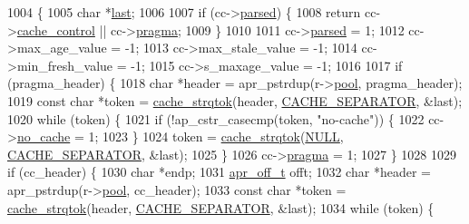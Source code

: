 \begin{DoxyCode}
1004 \{
1005     \textcolor{keywordtype}{char} *\hyperlink{group__apr__strings_ga882d08c2e3ad3004cdfc219601ebaac8}{last};
1006 
1007     \textcolor{keywordflow}{if} (cc->\hyperlink{structcache__control_a386401082305485525836ed568c6b46a}{parsed}) \{
1008         \textcolor{keywordflow}{return} cc->\hyperlink{structcache__control_ab54624480acafa695556a98b70938413}{cache\_control} || cc->\hyperlink{structcache__control_a60d185604c017054a36964edaadd0220}{pragma};
1009     \}
1010 
1011     cc->\hyperlink{structcache__control_a386401082305485525836ed568c6b46a}{parsed} = 1;
1012     cc->max\_age\_value = -1;
1013     cc->max\_stale\_value = -1;
1014     cc->min\_fresh\_value = -1;
1015     cc->s\_maxage\_value = -1;
1016 
1017     \textcolor{keywordflow}{if} (pragma\_header) \{
1018         \textcolor{keywordtype}{char} *header = apr\_pstrdup(r->\hyperlink{structrequest__rec_aa0a0c16f9a9ab3901cdb3f3c9c9d83d0}{pool}, pragma\_header);
1019         \textcolor{keyword}{const} \textcolor{keywordtype}{char} *token = \hyperlink{group__Cache__util_gada03570414af2b2d9349449858036d90}{cache\_strqtok}(header, \hyperlink{group__Cache__util_ga2916636af38fdf277cb80c1c698c291a}{CACHE\_SEPARATOR}, &last);
1020         \textcolor{keywordflow}{while} (token) \{
1021             \textcolor{keywordflow}{if} (!ap\_cstr\_casecmp(token, \textcolor{stringliteral}{"no-cache"})) \{
1022                 cc->\hyperlink{structcache__control_a76e5095344c47d185ef638ba1b66f267}{no\_cache} = 1;
1023             \}
1024             token = \hyperlink{group__Cache__util_gada03570414af2b2d9349449858036d90}{cache\_strqtok}(\hyperlink{pcre_8txt_ad7f989d16aa8ca809a36bc392c07fba1}{NULL}, \hyperlink{group__Cache__util_ga2916636af38fdf277cb80c1c698c291a}{CACHE\_SEPARATOR}, &last);
1025         \}
1026         cc->\hyperlink{structcache__control_a60d185604c017054a36964edaadd0220}{pragma} = 1;
1027     \}
1028 
1029     \textcolor{keywordflow}{if} (cc\_header) \{
1030         \textcolor{keywordtype}{char} *endp;
1031         \hyperlink{group__apr__platform_ga6938af9075cec15c88299109381aa984}{apr\_off\_t} offt;
1032         \textcolor{keywordtype}{char} *header = apr\_pstrdup(r->\hyperlink{structrequest__rec_aa0a0c16f9a9ab3901cdb3f3c9c9d83d0}{pool}, cc\_header);
1033         \textcolor{keyword}{const} \textcolor{keywordtype}{char} *token = \hyperlink{group__Cache__util_gada03570414af2b2d9349449858036d90}{cache\_strqtok}(header, \hyperlink{group__Cache__util_ga2916636af38fdf277cb80c1c698c291a}{CACHE\_SEPARATOR}, &last);
1034         \textcolor{keywordflow}{while} (token) \{

\end{DoxyCode}
